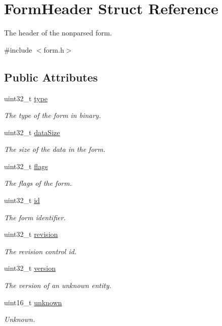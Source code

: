 \hypertarget{struct_form_header}{}\section{Form\+Header Struct Reference}
\label{struct_form_header}


The header of the nonparsed form.  




{\ttfamily \#include $<$form.\+h$>$}

\subsection*{Public Attributes}
\begin{DoxyCompactItemize}
\item 
uint32\+\_\+t \hyperlink{struct_form_header_a7c328abb1290000cef194ba4b71289db}{type}
\begin{DoxyCompactList}\small\item\em The type of the form in binary. \end{DoxyCompactList}\item 
uint32\+\_\+t \hyperlink{struct_form_header_a39628718fdb8e8825236f8d435bb723a}{data\+Size}
\begin{DoxyCompactList}\small\item\em The size of the data in the form. \end{DoxyCompactList}\item 
uint32\+\_\+t \hyperlink{struct_form_header_afdbca03050703e03f70e073ad1fda83f}{flags}
\begin{DoxyCompactList}\small\item\em The flags of the form. \end{DoxyCompactList}\item 
uint32\+\_\+t \hyperlink{struct_form_header_a848f4bb1320b2c08b8d865151ccd8ee3}{id}
\begin{DoxyCompactList}\small\item\em The form identifier. \end{DoxyCompactList}\item 
uint32\+\_\+t \hyperlink{struct_form_header_a32a8415135b878ae97078d696cf54e1e}{revision}
\begin{DoxyCompactList}\small\item\em The revision control id. \end{DoxyCompactList}\item 
uint32\+\_\+t \hyperlink{struct_form_header_a44d62c93920ca145bdfa363ee71b18aa}{version}
\begin{DoxyCompactList}\small\item\em The version of an unknown entity. \end{DoxyCompactList}\item 
uint16\+\_\+t \hyperlink{struct_form_header_aec53fee93e6738cbb7d95e74043337ac}{unknown}
\begin{DoxyCompactList}\small\item\em Unknown. \end{DoxyCompactList}\end{DoxyCompactItemize}


